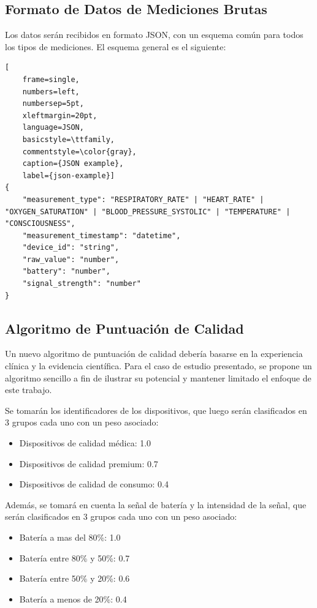 \subsection{Formato de Datos de Mediciones Brutas}

Los datos serán recibidos en formato JSON, con un esquema común para todos los tipos de mediciones.
El esquema general es el siguiente:
\begin{lstlisting}[
    frame=single,
    numbers=left,
    numbersep=5pt,
    xleftmargin=20pt,
    language=JSON,
    basicstyle=\ttfamily,
    commentstyle=\color{gray},
    caption={JSON example},
    label={json-example}]
{
    "measurement_type": "RESPIRATORY_RATE" | "HEART_RATE" | "OXYGEN_SATURATION" | "BLOOD_PRESSURE_SYSTOLIC" | "TEMPERATURE" | "CONSCIOUSNESS",
    "measurement_timestamp": "datetime",
    "device_id": "string",
    "raw_value": "number",
    "battery": "number",
    "signal_strength": "number"
}
\end{lstlisting}
\newpage

\subsection{Algoritmo de Puntuación de Calidad}
Un nuevo algoritmo de puntuación de calidad debería basarse en la experiencia clínica y la evidencia científica. Para el caso de estudio presentado, 
se propone un algoritmo sencillo a fin de ilustrar su potencial y mantener limitado el enfoque de este trabajo.

Se tomarán los identificadores de los dispositivos, que luego serán clasificados en 3 grupos cada uno con un peso asociado: 
\begin{itemize}
    \item Dispositivos de calidad médica: 1.0
    \item Dispositivos de calidad premium: 0.7
    \item Dispositivos de calidad de consumo: 0.4
\end{itemize}

Además, se tomará en cuenta la señal de batería y la intensidad de la señal, que serán clasificados en 3 grupos cada uno con un peso asociado:
\begin{itemize}
    \item Batería a mas del 80\%: 1.0
    \item Batería entre 80\% y 50\%: 0.7
    \item Batería entre 50\% y 20\%: 0.6
    \item Batería a menos de 20\%: 0.4
\end{itemize}

